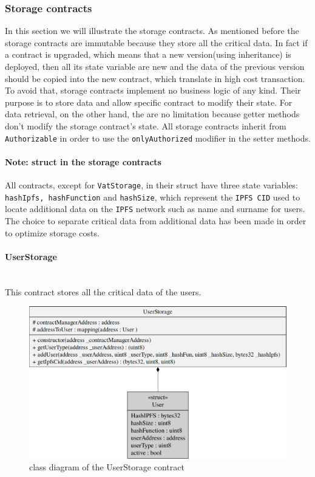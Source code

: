 \hypertarget{st}{\subsubsection{Storage contracts}}
In this section we will illustrate the storage contracts. As mentioned before the storage contracts are immutable because they store all the critical data. In fact if a contract is upgraded, which means that a new version(using inheritance) is deployed, then all its state variable are new and the data of the previous version should be copied into the new contract, which translate in high cost transaction.\\
To avoid that, storage contracts implement no business logic of any kind. Their purpose is to store data and allow specific contract to modify their state. For data retrieval, on the other hand, the are no limitation because getter methods don't modify the storage contract's state.
All storage contracts inherit from \texttt{Authorizable} in order to use the \texttt{onlyAuthorized} modifier in the setter methods.
\paragraph*{Note: struct in the storage contracts}
All contracts, except for \texttt{VatStorage}, in their struct have three state variables: \texttt{hashIpfs, hashFunction} and \texttt{hashSize}, which represent the \texttt{IPFS CID} used to locate additional data on the \texttt{IPFS} network such as name and surname for users. The choice to separate critical data from additional data has been made in order to optimize storage costs.
\pagebreak
\paragraph{UserStorage}\mbox{}\\

\noindent This contract stores all the critical data of the users. 
\begin{figure}[H]
	\centering
	\includegraphics[scale=0.25]{res/images/solidity/userstorage.png}
	\caption{class diagram of the UserStorage contract}
\end{figure}
\pagebreak
